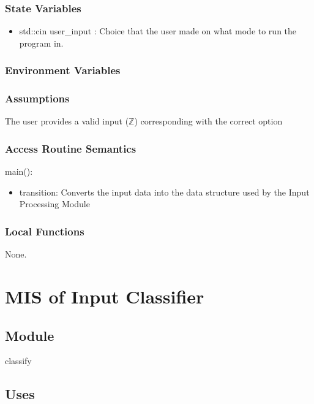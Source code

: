 \documentclass[12pt, titlepage]{article}
\begin{document}
\subsubsection{State Variables}

\begin{itemize}
  \item std::cin user\_input : Choice that the user made on what mode to run the program in.
\end{itemize}

\subsubsection{Environment Variables}


\subsubsection{Assumptions}

The user provides a valid input ($\mathbb{Z}$) corresponding with the correct option

\subsubsection{Access Routine Semantics}

\noindent main():
\begin{itemize}
  \item transition: Converts the input data into the data structure used by the Input Processing Module
\end{itemize}

\subsubsection{Local Functions}

None.

\newpage

\section{MIS of Input Classifier} \label{ModuleIC} 

\subsection{Module}

classify

\subsection{Uses}
\end{document}
